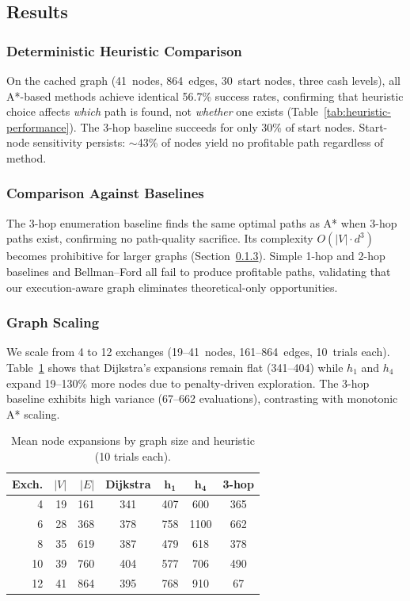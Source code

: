 \subsection{Results}

\subsubsection{Deterministic Heuristic Comparison}

On the cached graph (41~nodes, 864~edges, 30~start nodes, three cash levels), all A*-based methods achieve identical 56.7\% success rates, confirming that heuristic choice affects \emph{which} path is found, not \emph{whether} one exists (Table~\ref{tab:heuristic-performance}). The 3-hop baseline succeeds for only 30\% of start nodes. Start-node sensitivity persists: $\sim$43\% of nodes yield no profitable path regardless of method.

\subsubsection{Comparison Against Baselines}

The 3-hop enumeration baseline finds the same optimal paths as A* when 3-hop paths exist, confirming no path-quality sacrifice. Its complexity $O(|V| \cdot d^3)$ becomes prohibitive for larger graphs (Section~\ref{sec:graph_scaling}). Simple 1-hop and 2-hop baselines and Bellman--Ford all fail to produce profitable paths, validating that our execution-aware graph eliminates theoretical-only opportunities.

\subsubsection{Graph Scaling}
\label{sec:graph_scaling}

We scale from 4 to 12 exchanges (19--41~nodes, 161--864~edges, 10~trials each). Table~\ref{tab:graph_scaling} shows that Dijkstra's expansions remain flat (341--404) while $h_1$ and $h_4$ expand 19--130\% more nodes due to penalty-driven exploration. The 3-hop baseline exhibits high variance (67--662 evaluations), contrasting with monotonic A* scaling.

\begin{table}[t]
\centering
\small
\caption{Mean node expansions by graph size and heuristic (10 trials each).}
\label{tab:graph_scaling}
\begin{tabular}{rrrcccc}
\toprule
\textbf{Exch.} & \textbf{$|V|$} & \textbf{$|E|$} & \textbf{Dijkstra} & $\mathbf{h_1}$ & $\mathbf{h_4}$ & \textbf{3-hop} \\
\midrule
 4 &  19 &  161 & 341 & 407 & 600 & 365 \\
 6 &  28 &  368 & 378 & 758 & 1100 & 662 \\
 8 &  35 &  619 & 387 & 479 & 618 & 378 \\
10 &  39 &  760 & 404 & 577 & 706 & 490 \\
12 &  41 &  864 & 395 & 768 & 910 &  67 \\
\bottomrule
\end{tabular}
\end{table}


